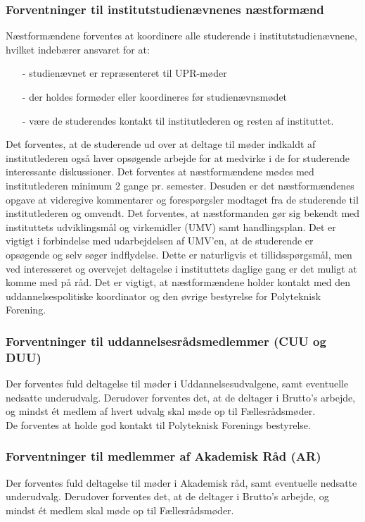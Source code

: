\subsubsection{Forventninger til institutstudienævnenes næstformænd}
Næstformændene forventes at koordinere alle studerende i institutstudienævnene, hvilket indebærer ansvaret for at:
\begin{enumerate}
\item[-] studienævnet er repræsenteret til UPR-møder
\item[-] der holdes formøder eller koordineres før studienævnsmødet
\item[-] være de studerendes kontakt til institutlederen og resten af instituttet.
\end{enumerate}

Det forventes, at de studerende ud over at deltage til møder indkaldt af institutlederen også laver opsøgende arbejde for at medvirke i de for studerende interessante diskussioner. Det forventes at næstformændene mødes med institutlederen minimum 2 gange pr. semester. Desuden er det næstformændenes opgave at videregive kommentarer og forespørgsler modtaget fra de studerende til institutlederen og omvendt. Det forventes, at næstformanden gør sig bekendt med instituttets udviklingsmål og virkemidler (UMV) samt handlingsplan. Det er vigtigt i forbindelse med udarbejdelsen af UMV’en, at de studerende er opsøgende og selv søger indflydelse. Dette er naturligvis et tillidsspørgsmål, men ved interesseret og overvejet deltagelse i instituttets daglige gang er det muligt at komme med på råd.
Det er vigtigt, at næstformændene holder kontakt med den uddannelsespolitiske koordinator og den øvrige bestyrelse for Polyteknisk Forening.

\subsubsection{Forventninger til uddannelsesrådsmedlemmer (CUU og DUU)}
Der forventes fuld deltagelse til møder i Uddannelsesudvalgene, samt eventuelle nedsatte underudvalg. Derudover forventes det, at de deltager i Brutto’s arbejde, og mindst ét medlem af hvert udvalg skal møde op til Fællesrådsmøder. \\

De forventes at holde god kontakt til Polyteknisk Forenings bestyrelse.

\subsubsection{Forventninger til medlemmer af Akademisk Råd (AR)}
Der forventes fuld deltagelse til møder i Akademisk råd, samt eventuelle nedsatte underudvalg. Derudover forventes det, at de deltager i Brutto’s arbejde, og mindst ét medlem skal møde op til Fællesrådsmøder.\\

